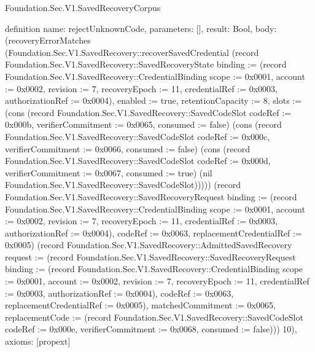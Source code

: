 \begin{lexlean}{Foundation.Sec.V1.SavedRecoveryCorpus}
\begin{semanticmodule}
definition{
  name: rejectUnknownCode,
  parameters: [],
  result: Bool,
  body: (recoveryErrorMatches (Foundation.Sec.V1.SavedRecovery::recoverSavedCredential (record Foundation.Sec.V1.SavedRecovery::SavedRecoveryState {binding := (record Foundation.Sec.V1.SavedRecovery::CredentialBinding {scope := 0x0001, account := 0x0002, revision := 7, recoveryEpoch := 11, credentialRef := 0x0003, authorizationRef := 0x0004}), enabled := true, retentionCapacity := 8, slots := (cons (record Foundation.Sec.V1.SavedRecovery::SavedCodeSlot {codeRef := 0x000b, verifierCommitment := 0x0065, consumed := false}) (cons (record Foundation.Sec.V1.SavedRecovery::SavedCodeSlot {codeRef := 0x000c, verifierCommitment := 0x0066, consumed := false}) (cons (record Foundation.Sec.V1.SavedRecovery::SavedCodeSlot {codeRef := 0x000d, verifierCommitment := 0x0067, consumed := true}) (nil Foundation.Sec.V1.SavedRecovery::SavedCodeSlot))))}) (record Foundation.Sec.V1.SavedRecovery::SavedRecoveryRequest {binding := (record Foundation.Sec.V1.SavedRecovery::CredentialBinding {scope := 0x0001, account := 0x0002, revision := 7, recoveryEpoch := 11, credentialRef := 0x0003, authorizationRef := 0x0004}), codeRef := 0x0063, replacementCredentialRef := 0x0005}) (record Foundation.Sec.V1.SavedRecovery::AdmittedSavedRecovery {request := (record Foundation.Sec.V1.SavedRecovery::SavedRecoveryRequest {binding := (record Foundation.Sec.V1.SavedRecovery::CredentialBinding {scope := 0x0001, account := 0x0002, revision := 7, recoveryEpoch := 11, credentialRef := 0x0003, authorizationRef := 0x0004}), codeRef := 0x0063, replacementCredentialRef := 0x0005}), matchedCommitment := 0x0065, replacementCode := (record Foundation.Sec.V1.SavedRecovery::SavedCodeSlot {codeRef := 0x000e, verifierCommitment := 0x0068, consumed := false})})) 10),
  axioms: [propext]
}


\end{semanticmodule}
\end{lexlean}
